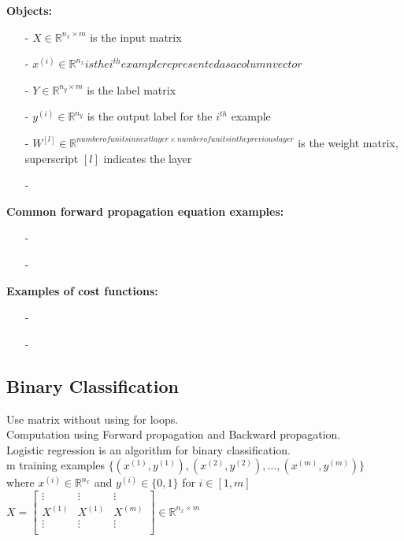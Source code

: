 \documentclass{article}
\begin{document}
    \textbf{Objects:}
    \begin{itemize}
        \item[-]{$X \in \mathbb{R}^{n_x \times m}$ is the input matrix}
        \item[-]{$x^{(i)} \in \mathbb{R}^{n_x} is the i^{th} example represented as a column vector $}
        \item[-]{$Y \in \mathbb{R}^{n_y \times m}$ is the label matrix}
        \item[-]{$y^{(i)} \in \mathbb{R}^{n_y}$ is the output label for the $i^{th}$ example}
        \item[-]{$W^{[l]} \in \mathbb{R}^{number of units in next layer \times number of units in the previous layer}$ is the weight matrix, superscript $[l]$ indicates the layer}
        \item[-]{}
    \end{itemize}

    \textbf{Common forward propagation equation examples:}
    \begin{itemize}
        \item[-]{}
        \item[-]{}
    \end{itemize}

    \textbf{Examples of cost functions:}
    \begin{itemize}
        \item[-]{}
        \item[-]{}
    \end{itemize}

\newpage
\subsection{Binary Classification}

    Use matrix without using for loops.\\
    Computation using Forward propagation and Backward propagation.\\
    Logistic regression is an algorithm for binary classification.\\

    m training examples
    $\{(x^{(1)}, y^{(1)}), (x^{(2)}, y^{(2)}), \hdots, (x^{(m)}, y^{(m)})\}$ \\
    where $x^{(i)} \in \mathbb{R}^{n_x}$ and $y^{(i)} \in \{0,1\}$ for $i \in [1,m]$ \\

    $X =
    \begin{bmatrix}
        \vdots & \vdots & \vdots \\
        X^{(1)} & X^{(1)} & X^{(m)} \\
        \vdots & \vdots & \vdots \\
    \end{bmatrix}
    \in \mathbb{R}^{n_x \times m}
    $\\
\end{document}
